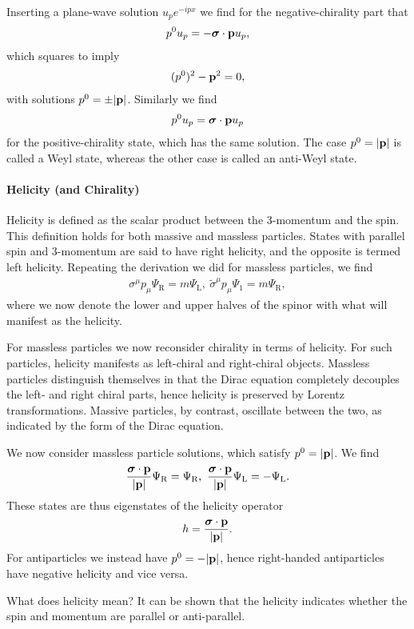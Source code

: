 Inserting a plane-wave solution $u_{p}e^{-ipx}$ we find for the negative-chirality part that
\begin{align*}
	p^{0}u_{p} = -\vb*{\sigma}\cdot\vb{p}u_{p},
\end{align*}
which squares to imply
\begin{align*}
	(p^{0})^{2} - \vb{p}^{2} = 0,
\end{align*}
with solutions $p^{0} = \pm\abs{\vb{p}}$. Similarly we find
\begin{align*}
	p^{0}u_{p} = \vb*{\sigma}\cdot\vb{p}u_{p}
\end{align*}
for the positive-chirality state, which has the same solution. The case $p^{0} = \abs{\vb{p}}$ is called a Weyl state, whereas the other case is called an anti-Weyl state.

\paragraph{Helicity (and Chirality)}
Helicity is defined as the scalar product between the 3-momentum and the spin. This definition holds for both massive and massless particles. States with parallel spin and 3-momentum are said to have right helicity, and the opposite is termed left helicity. Repeating the derivation we did for massless particles, we find
\begin{align*}
	\sigma^{\mu}p_{\mu}\Psi_{\text{R}} = m\Psi_{\text{L}},\ \tilde{\sigma}^{\mu}p_{\mu}\Psi_{1} = m\Psi_{\text{R}},
\end{align*}
where we now denote the lower and upper halves of the spinor with what will manifest as the helicity.

For massless particles we now reconsider chirality in terms of helicity. For such particles, helicity manifests as left-chiral and right-chiral objects. Massless particles distinguish themselves in that the Dirac equation completely decouples the left- and right chiral parts, hence helicity is preserved by Lorentz transformations. Massive particles, by contrast, oscillate between the two, as indicated by the form of the Dirac equation.

We now consider massless particle solutions, which satisfy $p^{0} = \abs{\vb{p}}$. We find
\begin{align*}
	\frac{\vb*{\sigma}\cdot\vb{p}}{\abs{\vb{p}}}\Psi_{\text{R}} = \Psi_{\text{R}},\ \frac{\vb*{\sigma}\cdot\vb{p}}{\abs{\vb{p}}}\Psi_{\text{L}} = -\Psi_{\text{L}}.
\end{align*}
These states are thus eigenstates of the helicity operator
\begin{align*}
	h = \frac{\vb*{\sigma}\cdot\vb{p}}{\abs{\vb{p}}}.
\end{align*}
For antiparticles we instead have $p^{0} = -\abs{\vb{p}}$, hence right-handed antiparticles have negative helicity and vice versa.

What does helicity mean? It can be shown that the helicity indicates whether the spin and momentum are parallel or anti-parallel.